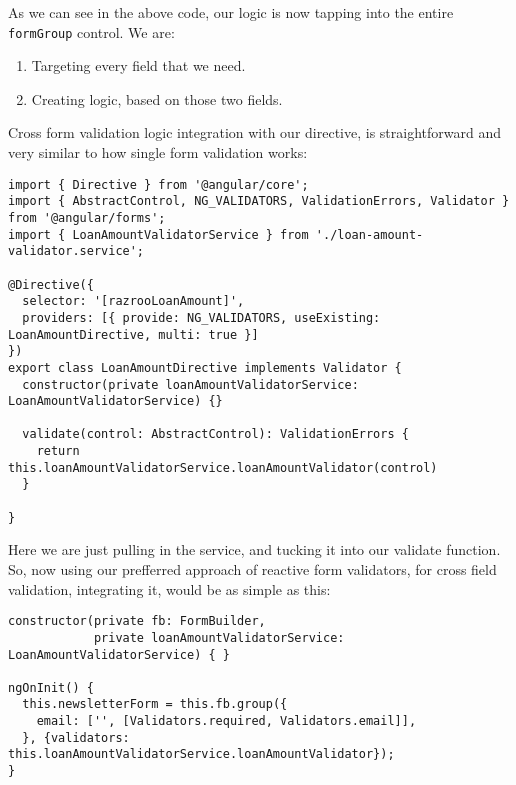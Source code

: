 As we can see in the above code, our logic is now tapping into the entire 
\lstinline{formGroup} control. We are: 
\begin{enumerate}
  \item Targeting every field that we need.
  \item Creating logic, based on those two fields.    
\end{enumerate}

Cross form validation logic integration with our directive, is straightforward and very similar 
to how single form validation works: 

\begin{lstlisting}[caption=loan-amount.directive.ts]
import { Directive } from '@angular/core';
import { AbstractControl, NG_VALIDATORS, ValidationErrors, Validator } from '@angular/forms';
import { LoanAmountValidatorService } from './loan-amount-validator.service';

@Directive({
  selector: '[razrooLoanAmount]',
  providers: [{ provide: NG_VALIDATORS, useExisting: LoanAmountDirective, multi: true }]
})
export class LoanAmountDirective implements Validator {
  constructor(private loanAmountValidatorService: LoanAmountValidatorService) {}

  validate(control: AbstractControl): ValidationErrors {
    return this.loanAmountValidatorService.loanAmountValidator(control)
  }

} 
\end{lstlisting}

Here we are just pulling in the service, and tucking it into our validate function. So, 
now using our prefferred approach of reactive form validators, for cross field validation, 
integrating it, would be as simple as this:

\begin{lstlisting}[caption=finance-calculator.ts]
constructor(private fb: FormBuilder,
            private loanAmountValidatorService: LoanAmountValidatorService) { }

ngOnInit() {
  this.newsletterForm = this.fb.group({
    email: ['', [Validators.required, Validators.email]],
  }, {validators: this.loanAmountValidatorService.loanAmountValidator});
}
\end{lstlisting}